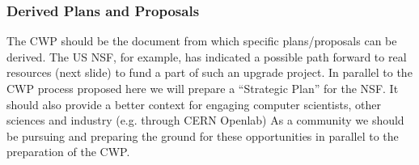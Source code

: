 \begin{frame}
\frametitle{Derived Plans and Proposals} 
The CWP should be the document from which specific plans/proposals can be derived. The US NSF, for example, has indicated a possible path forward to real resources (next slide) to fund a part of such an upgrade project. In parallel to the CWP process proposed here we will prepare a ``Strategic Plan'' for the NSF.
\vskip 0.15in
It should also provide a better context for engaging computer scientists, other sciences and industry (e.g. through CERN Openlab)
\vskip 0.15in
As a community we should be pursuing and preparing the ground for these opportunities in parallel to the preparation of the CWP.
\end{frame}


